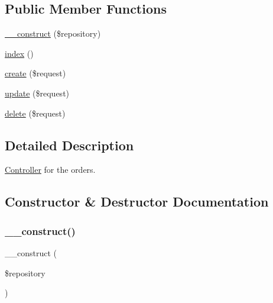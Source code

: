 \subsection*{Public Member Functions}
\begin{DoxyCompactItemize}
\item 
\mbox{\hyperlink{class_app_1_1_http_1_1_controllers_1_1_order_controller_a5b75ba6bc9debb999c0186a31978ec03}{\+\_\+\+\_\+construct}} (\$repository)
\item 
\mbox{\hyperlink{class_app_1_1_http_1_1_controllers_1_1_order_controller_a149eb92716c1084a935e04a8d95f7347}{index}} ()
\item 
\mbox{\hyperlink{class_app_1_1_http_1_1_controllers_1_1_order_controller_a4fa811c83f27da01b0d92bdb2a711a13}{create}} (\$request)
\item 
\mbox{\hyperlink{class_app_1_1_http_1_1_controllers_1_1_order_controller_ab7b27a90191560dcef32126b0945db0d}{update}} (\$request)
\item 
\mbox{\hyperlink{class_app_1_1_http_1_1_controllers_1_1_order_controller_a126a3799c44d72393ca4732081306dfd}{delete}} (\$request)
\end{DoxyCompactItemize}


\subsection{Detailed Description}
\mbox{\hyperlink{class_app_1_1_http_1_1_controllers_1_1_controller}{Controller}} for the orders. 

\subsection{Constructor \& Destructor Documentation}
\mbox{\label{class_app_1_1_http_1_1_controllers_1_1_order_controller_a5b75ba6bc9debb999c0186a31978ec03}} 
\subsubsection{\texorpdfstring{\+\_\+\+\_\+construct()}{\_\_construct()}}
{\footnotesize\ttfamily \+\_\+\+\_\+construct (\begin{DoxyParamCaption}\item[{}]{\$repository }\end{DoxyParamCaption})}

